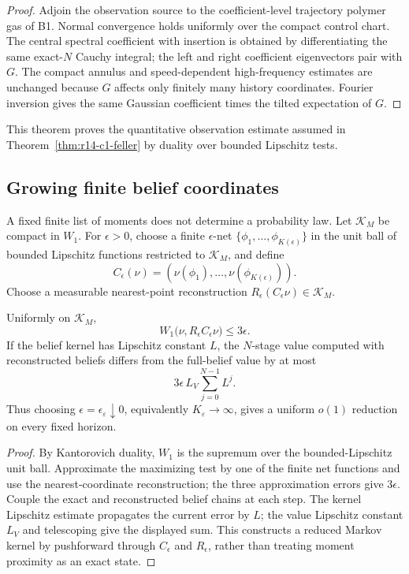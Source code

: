 \begin{proof}
Adjoin the observation source to the coefficient-level trajectory polymer
gas of B1.  Normal convergence holds uniformly over the compact control
chart.  The central spectral coefficient with insertion is obtained by
differentiating the same exact-\(N\) Cauchy integral; the left and right
coefficient eigenvectors pair with \(G\).  The compact annulus and
speed-dependent high-frequency estimates are unchanged because \(G\) affects
only finitely many history coordinates.  Fourier inversion gives the same
Gaussian coefficient times the tilted expectation of \(G\).
\end{proof}

This theorem proves the quantitative observation estimate assumed in
Theorem~\ref{thm:r14-c1-feller} by duality over bounded Lipschitz tests.

\subsection{Growing finite belief coordinates}

A fixed finite list of moments does not determine a probability law.  Let
\(\mathcal K_M\) be compact in \(W_1\).  For \(\epsilon>0\), choose a finite
\(\epsilon\)-net \(\{\phi_1,\ldots,\phi_{K(\epsilon)}\}\) in the unit ball of
bounded Lipschitz functions restricted to \(\mathcal K_M\), and define
\[
 C_\epsilon(\nu)
 =(\nu(\phi_1),\ldots,\nu(\phi_{K(\epsilon)})).
\]
Choose a measurable nearest-point reconstruction
\(R_\epsilon(C_\epsilon\nu)\in\mathcal K_M\).

\begin{lemma}
\label{lem:r14-c1-coordinates}
Uniformly on \(\mathcal K_M\),
\[
 W_1\bigl(\nu,R_\epsilon C_\epsilon\nu\bigr)\le3\epsilon .
\]
If the belief kernel has Lipschitz constant \(L\), the \(N\)-stage value
computed with reconstructed beliefs differs from the full-belief value by at
most
\[
 3\epsilon\,L_V\sum_{j=0}^{N-1}L^j .
\]
Thus choosing \(\epsilon=\epsilon_\varepsilon\downarrow0\), equivalently
\(K_\varepsilon\to\infty\), gives a uniform \(o(1)\) reduction on every
fixed horizon.
\end{lemma}

\begin{proof}
By Kantorovich duality, \(W_1\) is the supremum over the bounded-Lipschitz unit
ball.  Approximate the maximizing test by one of the finite net functions and
use the nearest-coordinate reconstruction; the three approximation errors
give \(3\epsilon\).  Couple the exact and reconstructed belief chains at each
step.  The kernel Lipschitz estimate propagates the current error by \(L\);
the value Lipschitz constant \(L_V\) and telescoping give the displayed sum.
This constructs a reduced Markov kernel by pushforward through
\(C_\epsilon\) and \(R_\epsilon\), rather than treating moment proximity as
an exact state.
\end{proof}

